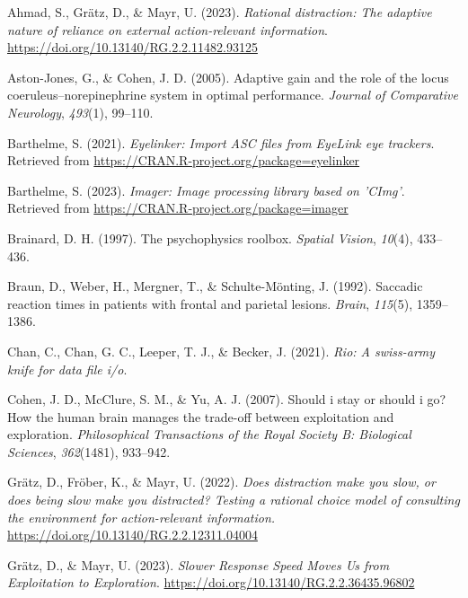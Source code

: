 \documentclass[
  man]{apa6}
\newlength{\cslhangindent}
\newlength{\cslentryspacingunit} %
\newenvironment{CSLReferences}[2] %
 {%
  \setlength{\parindent}{0pt}
  \ifodd #1
  \let\oldpar\par
  \def\par{\hangindent=\cslhangindent\oldpar}
  \fi
  \setlength{\parskip}{#2\cslentryspacingunit}
 }%
 {}
\begin{document}
\hypertarget{refs}{}
\begin{CSLReferences}{1}{0}
\leavevmode{}%
Ahmad, S., Grätz, D., \& Mayr, U. (2023). \emph{Rational distraction: {The} adaptive nature of reliance on external action-relevant information}. \url{https://doi.org/10.13140/RG.2.2.11482.93125}

\leavevmode{}%
Aston-Jones, G., \& Cohen, J. D. (2005). Adaptive gain and the role of the locus coeruleus--norepinephrine system in optimal performance. \emph{Journal of Comparative Neurology}, \emph{493}(1), 99--110.

\leavevmode{}%
Barthelme, S. (2021). \emph{Eyelinker: Import ASC files from EyeLink eye trackers}. Retrieved from \url{https://CRAN.R-project.org/package=eyelinker}

\leavevmode{}%
Barthelme, S. (2023). \emph{Imager: Image processing library based on 'CImg'}. Retrieved from \url{https://CRAN.R-project.org/package=imager}

\leavevmode{}%
Brainard, D. H. (1997). The psychophysics roolbox. \emph{Spatial Vision}, \emph{10}(4), 433--436.

\leavevmode{}%
Braun, D., Weber, H., Mergner, T., \& Schulte-Mönting, J. (1992). Saccadic reaction times in patients with frontal and parietal lesions. \emph{Brain}, \emph{115}(5), 1359--1386.

\leavevmode{}%
Chan, C., Chan, G. C., Leeper, T. J., \& Becker, J. (2021). \emph{Rio: A swiss-army knife for data file i/o}.

\leavevmode{}%
Cohen, J. D., McClure, S. M., \& Yu, A. J. (2007). Should i stay or should i go? How the human brain manages the trade-off between exploitation and exploration. \emph{Philosophical Transactions of the Royal Society B: Biological Sciences}, \emph{362}(1481), 933--942.

\leavevmode{}%
Grätz, D., Fröber, K., \& Mayr, U. (2022). \emph{Does distraction make you slow, or does being slow make you distracted? {Testing} a rational choice model of consulting the environment for action-relevant information.} \url{https://doi.org/10.13140/RG.2.2.12311.04004}

\leavevmode{}%
Grätz, D., \& Mayr, U. (2023). \emph{Slower {Response} {Speed} {Moves} {Us} from {Exploitation} to {Exploration}}. \url{https://doi.org/10.13140/RG.2.2.36435.96802}


\end{CSLReferences}
\end{document}
